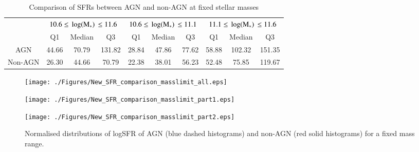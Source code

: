 \documentclass[fleqn,usenatbib]{mnras}
\begin{document}
 
\begin{table*}
\centering
\caption{Comparison of SFRs between AGN and non-AGN at fixed stellar masses}

\begin{tabular}{|c|c|c|c|c|c|c|c|c|c|}
\hline
\multirow{2}{*}{} & \multicolumn{3}{c|}{$\rm{10.6\leq\,\log (M_{*})\,\leq11.6}$} & \multicolumn{3}{c|}{$\rm{10.6\leq\,\log(M_{*})\,\leq11.1}$} & \multicolumn{3}{c|}{$\rm{11.1\leq\,\log(M_{*})\,\leq11.6}$} \\ \cline{2-10} 
                  & Q1       & Median      & Q3      & Q1       & Median      & Q3      & Q1      & Median     & Q3      \\ \hline
AGN               & 44.66    & 70.79       & 131.82  & 28.84    &47.86        & 77.62   & 58.88   & 102.32     & 151.35        \\ \hline
Non-AGN           & 26.30    & 44.66       & 70.79   & 22.38    & 38.01        & 56.23   & 52.48   & 75.85      & 119.67         \\ \hline
\end{tabular}

\label{Table3}
\end{table*}

\begin{figure}
\centering
\begin{minipage}[c]{0.49\textwidth}  
 \texttt{[image: ./Figures/New\_SFR\_comparison\_masslimit\_all.eps]}
\end{minipage}
\begin{minipage}[c]{0.49\textwidth}
\texttt{[image: ./Figures/New\_SFR\_comparison\_masslimit\_part1.eps]}
\end{minipage}
\begin{minipage}[c]{0.49\textwidth}
\texttt{[image: ./Figures/New\_SFR\_comparison\_masslimit\_part2.eps]}
\end{minipage}
\caption[Normalised distributions of logSFR at fixed mass range]{Normalised distributions of logSFR of AGN (blue dashed histograms) and non-AGN (red solid histograms) for a fixed mass range.}
\label{SameMAssRange}
\end{figure}
\end{document}
